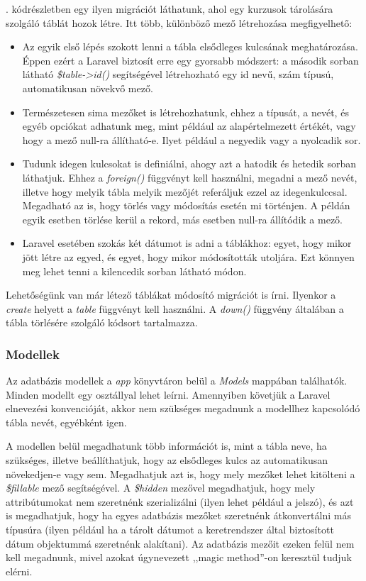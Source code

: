 \documentclass[
]{thesis-ekf}
\theoremstyle{definition}
\theoremstyle{remark}
\begin{document}
. kódrészletben egy ilyen migrációt láthatunk, ahol egy kurzusok tárolására szolgáló táblát hozok létre. Itt több, különböző mező létrehozása megfigyelhető:
\begin{itemize}
	\item Az egyik első lépés szokott lenni a tábla elsődleges kulcsának meghatározása. Éppen ezért a Laravel biztosít erre egy gyorsabb módszert: a második sorban látható \emph{\$table->id()} segítségével létrehozható egy id nevű, szám típusú, automatikusan növekvő mező.
	\item Természetesen sima mezőket is létrehozhatunk, ehhez a típusát, a nevét, és egyéb opciókat adhatunk meg, mint például az alapértelmezett értékét, vagy hogy a mező null-ra állítható-e. Ilyet például a negyedik vagy a nyolcadik sor.
	\item Tudunk idegen kulcsokat is definiálni, ahogy azt a hatodik és hetedik sorban láthatjuk. Ehhez a \emph{foreign()} függvényt kell használni, megadni a mező nevét, illetve hogy melyik tábla melyik mezőjét referáljuk ezzel az idegenkulccsal. Megadható az is, hogy törlés vagy módosítás esetén mi történjen. A példán egyik esetben törlése kerül a rekord, más esetben null-ra állítódik a mező.
	\item Laravel esetében szokás két dátumot is adni a táblákhoz: egyet, hogy mikor jött létre az egyed, és egyet, hogy mikor módosították utoljára. Ezt könnyen meg lehet tenni a kilencedik sorban látható módon.
\end{itemize}



Lehetőségünk van már létező táblákat módosító migrációt is írni. Ilyenkor a \emph{create} helyett a \emph{table} függvényt kell használni. A \emph{down()} függvény általában a tábla törlésére szolgáló kódsort tartalmazza.

\subsubsection{Modellek}

Az adatbázis modellek a \emph{app} könyvtáron belül a \emph{Models} mappában találhatók. Minden modellt egy osztállyal lehet leírni. Amennyiben követjük a Laravel elnevezési konvencióját\cite{tableNames}, akkor nem szükséges megadnunk a modellhez kapcsolódó tábla nevét, egyébként igen.

A modellen belül megadhatunk több információt is, mint a tábla neve, ha szükséges, illetve beállíthatjuk, hogy az elsődleges kulcs az automatikusan növekedjen-e vagy sem. Megadhatjuk azt is, hogy mely mezőket lehet kitölteni a \emph{\$fillable} mező segítségével. A \emph{\$hidden} mezővel megadhatjuk, hogy mely attribútumokat nem szeretnénk szerializálni (ilyen lehet például a jelszó), és azt is megadhatjuk, hogy ha egyes adatbázis mezőket szeretnénk átkonvertálni más típusúra (ilyen például ha a tárolt dátumot a keretrendszer által biztosított dátum objektummá szeretnénk alakítani). Az adatbázis mezőit ezeken felül nem kell megadnunk, mivel azokat úgynevezett ,,magic method''-on\cite{magicMethod} keresztül tudjuk elérni.
\end{document}
